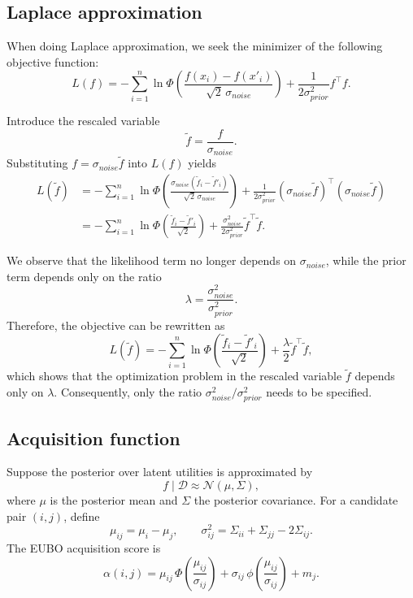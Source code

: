 \documentclass{article}
\begin{document}
\subsection{Laplace approximation}
When doing Laplace approximation, we seek the minimizer of the following objective function:
\begin{equation*}
L(f) = - \sum_{i=1}^n \ln \Phi\!\left(\frac{f(x_i) - f(x'_i)}{\sqrt{2}\,\sigma_{{noise}}}\right)
+ \frac{1}{2\sigma_{{prior}}^2} f^\top f.
\end{equation*}

Introduce the rescaled variable
\begin{equation*}
\tilde{f} = \frac{f}{\sigma_{{noise}}}.
\end{equation*}
Substituting $f = \sigma_{{noise}} \tilde{f}$ into $L(f)$ yields
\begin{align*}
L(\tilde{f}) 
&= - \sum_{i=1}^n \ln \Phi\!\left(
\frac{\sigma_{{noise}}(\tilde{f}_i - \tilde{f}'_i)}{\sqrt{2}\,\sigma_{{noise}}}
\right)
+ \frac{1}{2\sigma_{{prior}}^2} (\sigma_{{noise}} \tilde{f})^\top (\sigma_{{noise}} \tilde{f}) \\
&= - \sum_{i=1}^n \ln \Phi\!\left(
\frac{\tilde{f}_i - \tilde{f}'_i}{\sqrt{2}}
\right)
+ \frac{\sigma_{{noise}}^2}{2\sigma_{{prior}}^2} \tilde{f}^\top \tilde{f}.
\end{align*}

We observe that the likelihood term no longer depends on $\sigma_{{noise}}$, while the prior term depends only on the ratio
\begin{equation*}
\lambda = \frac{\sigma_{{noise}}^2}{\sigma_{{prior}}^2}.
\end{equation*}
Therefore, the objective can be rewritten as
\begin{equation*}
L(\tilde{f}) =
- \sum_{i=1}^n \ln \Phi\!\left(
\frac{\tilde{f}_i - \tilde{f}'_i}{\sqrt{2}}
\right)
+ \frac{\lambda}{2} \tilde{f}^\top \tilde{f},
\end{equation*}
which shows that the optimization problem in the rescaled variable $\tilde{f}$ depends only on $\lambda$. Consequently, only the ratio $\sigma_{{noise}}^2 / \sigma_{{prior}}^2$ needs to be specified.

\subsection{Acquisition function}

Suppose the posterior over latent utilities is approximated by
\begin{equation*}
f \mid \mathcal{D} \approx \mathcal{N}(\mu,\Sigma),
\end{equation*}
where $\mu$ is the posterior mean and $\Sigma$ the posterior covariance. For a candidate pair $(i,j)$, define
\begin{equation*}
\mu_{ij} = \mu_i - \mu_j,
\qquad
\sigma_{ij}^2 = \Sigma_{ii} + \Sigma_{jj} - 2\Sigma_{ij}.
\end{equation*}
The EUBO acquisition score is
\begin{equation*}
\alpha(i,j)
=
\mu_{ij}\,\Phi\!\left(\frac{\mu_{ij}}{\sigma_{ij}}\right)
+
\sigma_{ij}\,\phi\!\left(\frac{\mu_{ij}}{\sigma_{ij}}\right)
+
m_j .
\end{equation*}
\end{document}

